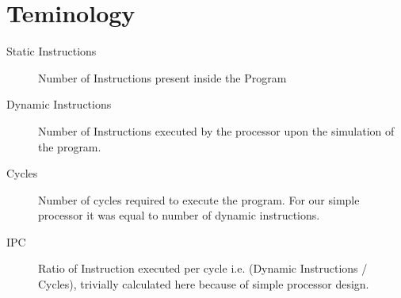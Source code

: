 \documentclass{article}
\begin{document}
\section{Teminology}

\begin{description}
    \item[Static Instructions] Number of Instructions present inside the Program
    \item[Dynamic Instructions] Number of Instructions executed by the processor upon the simulation of the program.
    \item[Cycles] Number of cycles required to execute the program. For our simple processor it was equal to number of dynamic instructions.
    \item[IPC] Ratio of Instruction executed per cycle i.e. (Dynamic Instructions / Cycles), trivially calculated here because of simple processor design.
\end{description}








\end{document}
